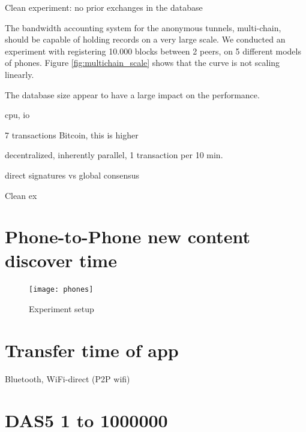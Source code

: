 Clean experiment: no prior exchanges in the database

 


The bandwidth accounting system for the anonymous tunnels, multi-chain, should be capable of holding records on a very large scale.
We conducted an experiment with registering 10.000 blocks between 2 peers, on 5 different models of phones.
Figure \ref{fig:multichain_scale} shows that the curve is not scaling linearly.

The database size appear to have a large impact on the performance. \cite{db_performance}

cpu, io

7 transactions Bitcoin, this is higher

decentralized, inherently parallel, 1 transaction per 10 min.

direct signatures vs global consensus


Clean ex


\section{Phone-to-Phone new content discover time}

\begin{figure}[h]
	\centering
	\texttt{[image: phones]}
	\caption{Experiment setup}
	\label{fig:phones}
\end{figure}



\section{Transfer time of app}

Bluetooth,
WiFi-direct (P2P wifi)


\section{DAS5 1 to 1000000} 

